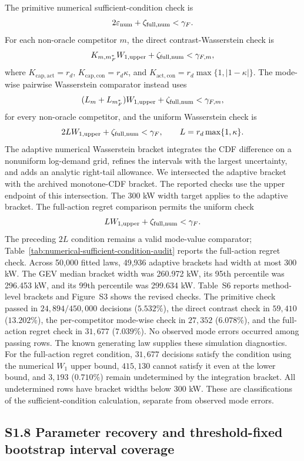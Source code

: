 \documentclass[]{interact}
\begin{document}
The primitive numerical sufficient-condition check is
\[
2\varepsilon_{\rm num}+\zeta_{\rm full,num}<\gamma_F.
\]
For each non-oracle competitor $m$, the direct
contrast-Wasserstein check is
\[
K_{m,m_F^\ast}W_{1,\rm upper}
+\zeta_{\rm full,num}<\gamma_{F,m},
\]
where $K_{\mathrm{cap},\mathrm{act}}=r_d$,
$K_{\mathrm{cap},\mathrm{con}}=r_d\kappa$, and
$K_{\mathrm{act},\mathrm{con}}=r_d\max\{1,|1-\kappa|\}$.
The mode-wise pairwise Wasserstein comparator instead uses
\[
(L_m+L_{m_F^\ast})W_{1,\rm upper}
+\zeta_{\rm full,num}<\gamma_{F,m},
\]
for every non-oracle competitor, and the uniform Wasserstein check is
\[
2L W_{1,\rm upper}+\zeta_{\rm full,num}<\gamma_F,
\qquad L=r_d\max\{1,\kappa\}.
\]
The adaptive numerical Wasserstein bracket integrates the CDF
difference on a nonuniform log-demand grid, refines the intervals with
the largest uncertainty, and adds an analytic right-tail allowance.
We intersected the adaptive bracket with the archived monotone-CDF
bracket. The reported checks use the upper endpoint of this
intersection. The 300 kW width target applies to the adaptive bracket.
The full-action regret comparison permits the uniform check
\[LW_{1,\rm upper}+\zeta_{\rm full,num}<\gamma_F.\]
The preceding $2L$ condition remains a valid mode-value comparator;
Table~\ref{tab:numerical-sufficient-condition-audit} reports the
full-action regret check. Across 50,000 fitted laws, 49,936 adaptive
brackets had width at most 300 kW. The GEV median bracket width was
260.972 kW, its 95th percentile was 296.453 kW, and its 99th
percentile was 299.634 kW. Table~S6 reports
method-level brackets and Figure~S3 shows the revised checks.
The primitive check passed in $24{,}894/450{,}000$ decisions
($5.532\%$), the direct contrast check in $59{,}410$ ($13.202\%$),
the per-competitor mode-wise check in $27{,}352$ ($6.078\%$), and the
full-action regret check in $31{,}677$ ($7.039\%$). No observed mode
errors occurred among passing rows. The known generating law supplies
these simulation diagnostics.
For the full-action regret condition, $31{,}677$ decisions satisfy the
condition using the numerical $W_1$ upper bound, $415{,}130$ cannot
satisfy it even at the lower bound, and $3{,}193$ ($0.710\%$) remain
undetermined by the integration bracket. All undetermined rows have
bracket widths below 300 kW. These are classifications of the
sufficient-condition calculation, separate from observed mode errors.

\subsection*{S1.8 Parameter recovery and threshold-fixed bootstrap interval coverage}
\end{document}
